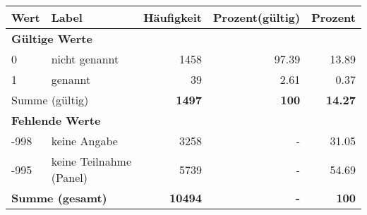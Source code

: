      \begin{longtable}{lXrrr}
     \toprule
     \textbf{Wert} & \textbf{Label} & \textbf{Häufigkeit} & \textbf{Prozent(gültig)} & \textbf{Prozent} \\
     \endhead
     \midrule
     \multicolumn{5}{l}{\textbf{Gültige Werte}}\\

     0 &
     \multicolumn{1}{X}{ nicht genannt   } &


       \num{1458} &
       \num[round-mode=places,round-precision=2]{97.39} &
         \num[round-mode=places,round-precision=2]{13.89} \\

     1 &
     \multicolumn{1}{X}{ genannt   } &


       \num{39} &
       \num[round-mode=places,round-precision=2]{2.61} &
         \num[round-mode=places,round-precision=2]{0.37} \\
     \midrule
     \multicolumn{2}{l}{Summe (gültig)} &
       \textbf{\num{1497}} &
     \textbf{\num{100}} &
       \textbf{\num[round-mode=places,round-precision=2]{14.27}} \\
     \multicolumn{5}{l}{\textbf{Fehlende Werte}}\\
       -998 &
       keine Angabe &
         \num{3258} &
        - &
         \num[round-mode=places,round-precision=2]{31.05} \\
       -995 &
       keine Teilnahme (Panel) &
         \num{5739} &
        - &
         \num[round-mode=places,round-precision=2]{54.69} \\
     \midrule
     \multicolumn{2}{l}{\textbf{Summe (gesamt)}} &
          \textbf{\num{10494}} &
        \textbf{-} &
        \textbf{\num{100}} \\
     \bottomrule
     \end{longtable}
     
